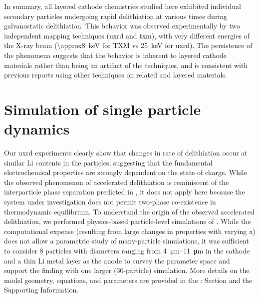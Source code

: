 \documentclass{article}
\begin{document}
In summary, all layered cathode chemistries studied here exhibited
individual secondary particles undergoing rapid delithiation at
various times during galvanostatic delithiation. This behavior was
observed experimentally by two independent mapping techniques
(\gls{uxrd} and \gls{txm}), with very different energies of the X-ray
beam (\SI{\approx8}{\kilo\electronvolt} for TXM vs
\SI{25}{\kilo\electronvolt} for \gls{uxrd}). The persistence of the
phenomena suggests that the behavior is inherent to layered cathode
materials rather than being an artifact of the techniques, and is
consistent with previous reports using other techniques on related
\nmc{} and  layered
materials\cite{chueh2021,rao2021,wang2020-6}.

\section{Simulation of single particle dynamics}


Our \gls{uxrd} experiments clearly show that changes in rate of
delithiation occur at similar Li contents in the particles, suggesting
that the fundamental electrochemical properties are strongly dependent
on the state of charge. While the observed phenomenon of accelerated
delithiation is reminiscent of the interparticle phase separation
predicted in  \cite{boesenberg2013,thornton2014},
it does not apply here because the system under investigation does not
permit two-phase co-existence in thermodynamic equilibrium. To
understand the origin of the observed accelerated delithiation, we
performed physics-based particle-level simulations of . While
the computational expense (resulting from large changes in properties
with varying x) does not allow a parametric study of many-particle
simulations, it was sufficient to consider 8 particles with diameters
ranging from \SIrange{4}{11}{\micro\meter} in the cathode and a thin
Li metal layer as the anode to survey the parameter space and support
the finding with one larger (30-particle) simulation. More details on
the model geometry, equations, and parameters are provided in the
:  Section and
the Supporting Information.
\end{document}
